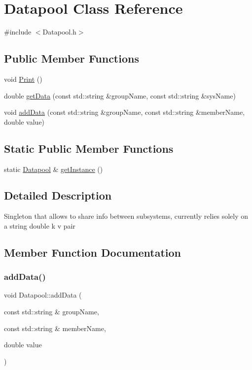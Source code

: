 \hypertarget{classDatapool}{}\section{Datapool Class Reference}
\label{classDatapool}


{\ttfamily \#include $<$Datapool.\+h$>$}

\subsection*{Public Member Functions}
\begin{DoxyCompactItemize}
\item 
void \hyperlink{classDatapool_afae02fe80bca3b1978317f2f7be8bec1}{Print} ()
\item 
double \hyperlink{classDatapool_a005421262c8c1a71fa93d167492ebb50}{get\+Data} (const std\+::string \&group\+Name, const std\+::string \&sys\+Name)
\item 
void \hyperlink{classDatapool_a4dcd17302657042344f3a1bcefce704f}{add\+Data} (const std\+::string \&group\+Name, const std\+::string \&member\+Name, double value)
\end{DoxyCompactItemize}
\subsection*{Static Public Member Functions}
\begin{DoxyCompactItemize}
\item 
static \hyperlink{classDatapool}{Datapool} \& \hyperlink{classDatapool_a9cfbb881291c80d851d0df66341b6299}{get\+Instance} ()
\end{DoxyCompactItemize}


\subsection{Detailed Description}
Singleton that allows to share info between subsystems, currently relies solely on a string double k v pair 

\subsection{Member Function Documentation}
\mbox{\label{classDatapool_a4dcd17302657042344f3a1bcefce704f}} 
\subsubsection{\texorpdfstring{add\+Data()}{addData()}}
{\footnotesize\ttfamily void Datapool\+::add\+Data (\begin{DoxyParamCaption}\item[{const std\+::string \&}]{group\+Name,  }\item[{const std\+::string \&}]{member\+Name,  }\item[{double}]{value }\end{DoxyParamCaption})}


